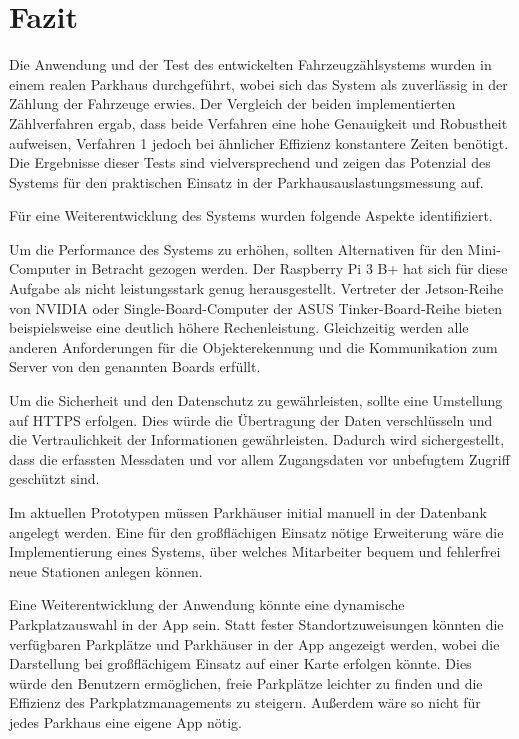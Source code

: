 \section{Fazit}\label{ch:Fazit}

Die Anwendung und der Test des entwickelten Fahrzeugzählsystems wurden in einem realen Parkhaus durchgeführt, wobei sich das System als zuverlässig in der Zählung der Fahrzeuge erwies.
Der Vergleich der beiden implementierten Zählverfahren ergab, dass beide Verfahren eine hohe Genauigkeit und Robustheit aufweisen, Verfahren 1 jedoch bei ähnlicher Effizienz konstantere Zeiten benötigt.
Die Ergebnisse dieser Tests sind vielversprechend und zeigen das Potenzial des Systems für den praktischen Einsatz in der Parkhausauslastungsmessung auf.

Für eine Weiterentwicklung des Systems wurden folgende Aspekte identifiziert.

Um die Performance des Systems zu erhöhen, sollten Alternativen für den Mini-Computer in Betracht gezogen werden.
Der Raspberry Pi 3 B+ hat sich für diese Aufgabe als nicht leistungsstark genug herausgestellt.
Vertreter der Jetson-Reihe von NVIDIA oder Single-Board-Computer der ASUS Tinker-Board-Reihe bieten beispielsweise eine deutlich höhere Rechenleistung.
Gleichzeitig werden alle anderen Anforderungen für die Objekterekennung und die Kommunikation zum Server von den genannten Boards erfüllt.

Um die Sicherheit und den Datenschutz zu gewährleisten, sollte eine Umstellung auf HTTPS erfolgen.
Dies würde die Übertragung der Daten verschlüsseln und die Vertraulichkeit der Informationen gewährleisten.
Dadurch wird sichergestellt, dass die erfassten Messdaten und vor allem Zugangsdaten vor unbefugtem Zugriff geschützt sind.

Im aktuellen Prototypen müssen Parkhäuser initial manuell in der Datenbank angelegt werden.
Eine für den großflächigen Einsatz nötige Erweiterung wäre die Implementierung eines Systems, über welches Mitarbeiter bequem und fehlerfrei neue Stationen anlegen können.

Eine Weiterentwicklung der Anwendung könnte eine dynamische Parkplatzauswahl in der App sein.
Statt fester Standortzuweisungen könnten die verfügbaren Parkplätze und Parkhäuser in der App angezeigt werden, wobei die Darstellung bei großflächigem Einsatz auf einer Karte erfolgen könnte.
Dies würde den Benutzern ermöglichen, freie Parkplätze leichter zu finden und die Effizienz des Parkplatzmanagements zu steigern.
Außerdem wäre so nicht für jedes Parkhaus eine eigene App nötig.

